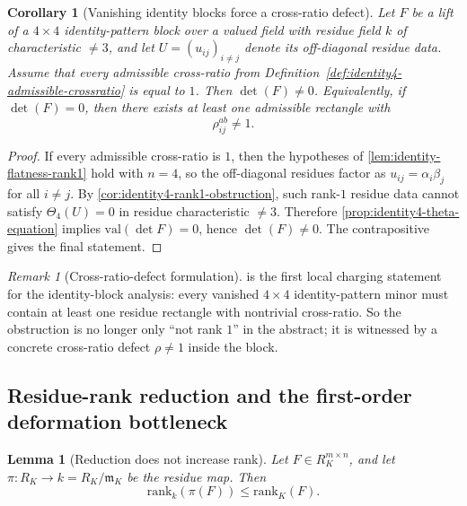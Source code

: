 \documentclass[11pt]{amsart}
\numberwithin{equation}{section}
\theoremstyle{plain}
\newtheorem{lemma}[theorem]{Lemma}
\newtheorem{corollary}[theorem]{Corollary}
\theoremstyle{definition}
\theoremstyle{remark}
\newtheorem{remark}[theorem]{Remark}
\newcommand{\rank}{\mathrm{rank}}
\newcommand{\val}{\mathrm{val}}
\begin{document}
\begin{corollary}[Vanishing identity blocks force a cross-ratio defect]
\label{cor:identity4-vanishing-forces-curvature}
Let $F$ be a lift of a $4\times4$ identity-pattern block over a valued field with residue field $k$ of characteristic $\neq 3$, and let $U=(u_{ij})_{i\neq j}$ denote its off-diagonal residue data.
Assume that every admissible cross-ratio from Definition~\ref{def:identity4-admissible-crossratio} is equal to $1$.
Then $\det(F)\neq 0$.
Equivalently, if $\det(F)=0$, then there exists at least one admissible rectangle with
\[
\rho_{ij}^{ab}\neq 1.
\]
\end{corollary}

\begin{proof}
If every admissible cross-ratio is $1$, then the hypotheses of \cref{lem:identity-flatness-rank1} hold with $n=4$, so the off-diagonal residues factor as $u_{ij}=\alpha_i\beta_j$ for all $i\neq j$.
By \cref{cor:identity4-rank1-obstruction}, such rank-$1$ residue data cannot satisfy $\Theta_4(U)=0$ in residue characteristic $\neq 3$.
Therefore \cref{prop:identity4-theta-equation} implies $\val(\det F)=0$, hence $\det(F)\neq 0$.
The contrapositive gives the final statement.
\end{proof}

\begin{remark}[Cross-ratio-defect formulation]
\label{rem:identity4-curvature-witness}
 is the first local charging statement for the identity-block analysis: every vanished $4\times4$ identity-pattern minor must contain at least one residue rectangle with nontrivial cross-ratio.
So the obstruction is no longer only ``not rank $1$'' in the abstract; it is witnessed by a concrete cross-ratio defect $\rho\neq 1$ inside the block.
\end{remark}


\subsection{Residue-rank reduction and the first-order deformation bottleneck}

\begin{lemma}[Reduction does not increase rank]
\label{lem:reduction-does-not-increase-rank}
Let $F\in R_K^{m\times n}$, and let $\pi:R_K\to k=R_K/\mathfrak m_K$ be the residue map.
Then
\[
\rank_k(\pi(F))\le \rank_K(F).
\]
\end{lemma}
\end{document}
